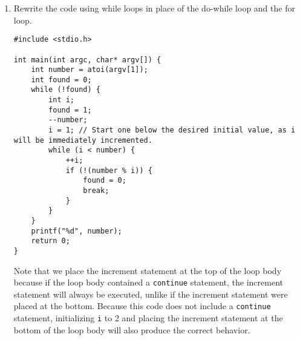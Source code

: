 \begin{enumerate}
\item Rewrite the code using while loops in place of the do-while loop and the for loop.

\begin{answer}
\begin{verbatim}
#include <stdio.h>

int main(int argc, char* argv[]) {
    int number = atoi(argv[1]);
    int found = 0;
    while (!found) {
        int i; 
        found = 1;
        --number;
        i = 1; // Start one below the desired initial value, as i will be immediately incremented.
        while (i < number) {
            ++i;
            if (!(number % i)) {
                found = 0;
                break;
            }
        }
    }
    printf("%d", number);
    return 0;
}
\end{verbatim}

Note that we place the increment statement at the top of the loop body because if the loop body contained a \texttt{continue} statement, the increment statement will always be executed, unlike if the increment statement were placed at the bottom. Because this code does not include a \texttt{continue} statement, initializing \texttt{i} to 2 and placing the increment statement at the bottom of the loop body will also produce the correct behavior.
\end{answer}

\end{enumerate}
